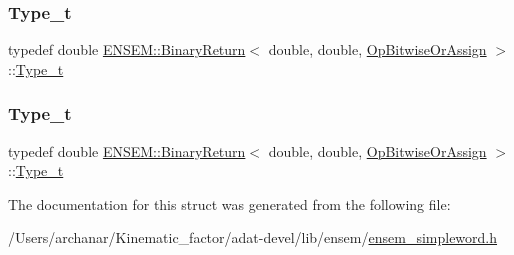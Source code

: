 \mbox{\label{structENSEM_1_1BinaryReturn_3_01double_00_01double_00_01OpBitwiseOrAssign_01_4_a28cf6b687041196193aa5c2f774eb33b}} 
\subsubsection{\texorpdfstring{Type\_t}{Type\_t}\hspace{0.1cm}{\footnotesize\ttfamily [2/3]}}
{\footnotesize\ttfamily typedef double \mbox{\hyperlink{structENSEM_1_1BinaryReturn}{E\+N\+S\+E\+M\+::\+Binary\+Return}}$<$ double, double, \mbox{\hyperlink{structENSEM_1_1OpBitwiseOrAssign}{Op\+Bitwise\+Or\+Assign}} $>$\+::\mbox{\hyperlink{structENSEM_1_1BinaryReturn_3_01double_00_01double_00_01OpBitwiseOrAssign_01_4_a28cf6b687041196193aa5c2f774eb33b}{Type\+\_\+t}}}

\mbox{\label{structENSEM_1_1BinaryReturn_3_01double_00_01double_00_01OpBitwiseOrAssign_01_4_a28cf6b687041196193aa5c2f774eb33b}} 
\subsubsection{\texorpdfstring{Type\_t}{Type\_t}\hspace{0.1cm}{\footnotesize\ttfamily [3/3]}}
{\footnotesize\ttfamily typedef double \mbox{\hyperlink{structENSEM_1_1BinaryReturn}{E\+N\+S\+E\+M\+::\+Binary\+Return}}$<$ double, double, \mbox{\hyperlink{structENSEM_1_1OpBitwiseOrAssign}{Op\+Bitwise\+Or\+Assign}} $>$\+::\mbox{\hyperlink{structENSEM_1_1BinaryReturn_3_01double_00_01double_00_01OpBitwiseOrAssign_01_4_a28cf6b687041196193aa5c2f774eb33b}{Type\+\_\+t}}}



The documentation for this struct was generated from the following file\+:\begin{DoxyCompactItemize}
\item 
/\+Users/archanar/\+Kinematic\+\_\+factor/adat-\/devel/lib/ensem/\mbox{\hyperlink{adat-devel_2lib_2ensem_2ensem__simpleword_8h}{ensem\+\_\+simpleword.\+h}}\end{DoxyCompactItemize}
